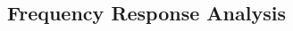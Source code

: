 \begin{multicols}{2}
\begin{CheatsheetEntryFrame}

    \end{CheatsheetEntryFrame}


\end{multicols}


\newpage
\subsection{Frequency Response Analysis}%
\label{sub:freq-response-analysis}

\begin{multicols}{2}

    \begin{CheatsheetEntryFrame}



    \end{CheatsheetEntryFrame}

\end{multicols}

